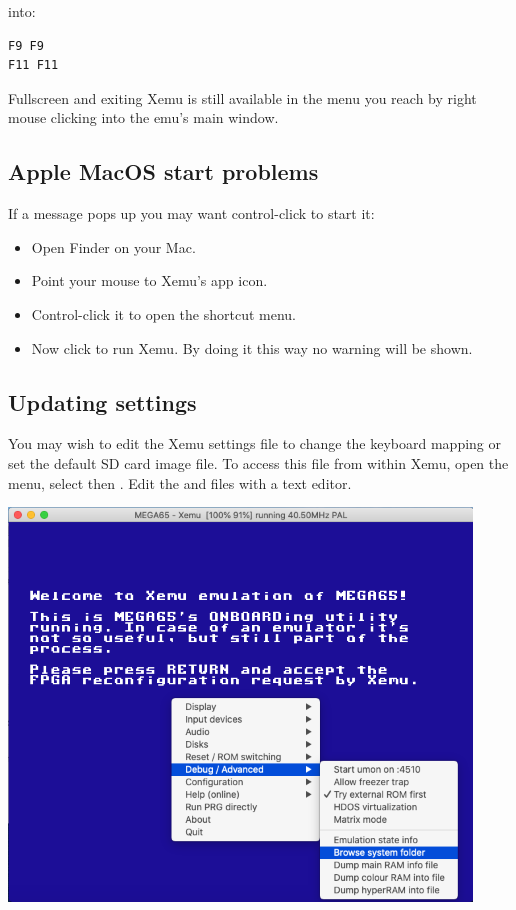 into:

\begin{tcolorbox}[colback=black,coltext=white]
\verbatimfont{\codefont}
\begin{verbatim}
F9 F9
F11 F11
\end{verbatim}
\end{tcolorbox}

Fullscreen and exiting Xemu is still available in the menu you reach by right mouse
clicking into the emu's main window.

\subsection{Apple MacOS start problems}

If a message  pops up you
may want control-click to start it:  

\begin{itemize}
  \item Open Finder on your Mac.
  \item Point your mouse to Xemu's app icon.
  \item Control-click it to open the shortcut menu.
  \item Now click  to run Xemu. By doing it this way no warning will be shown.
\end{itemize}

\subsection{Updating settings}
\label{sec:sdcard-settings-location}

You may wish to edit the Xemu settings file to change the keyboard mapping or set the
default SD card image file. To access this file from within Xemu, open the menu,
select  then . Edit the
 and  files with a text editor.

\begin{center}
  \includegraphics[width=0.5\linewidth]{images/xemusettings.png}
\end{center}

